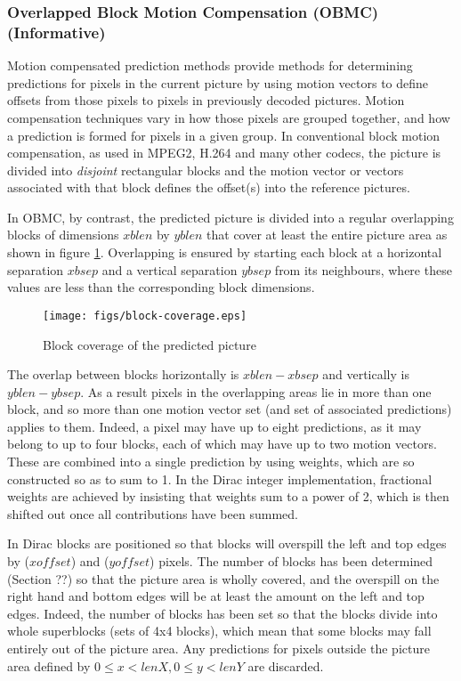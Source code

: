 \begin{informative*}
\subsubsection{Overlapped Block Motion Compensation (OBMC) (Informative)}

Motion compensated prediction methods provide methods for determining 
predictions for pixels in the current picture by using motion vectors to 
define offsets from those pixels to pixels in previously decoded
pictures. Motion compensation techniques vary in how those pixels are grouped
together, and how a prediction is formed for pixels in a given group. In 
conventional  block motion compensation, as used in MPEG2, H.264 and many other
codecs, the picture is divided into {\em disjoint} rectangular blocks and the
motion vector or vectors associated with that block defines the offset(s) into
the reference pictures.

In OBMC, by contrast, the predicted picture is divided into a regular overlapping 
blocks of dimensions $xblen$ by $yblen$ that cover at least the entire picture 
area as shown in figure \ref{fig:blockcoverage}.  Overlapping is ensured by starting
each block at a horizontal separation $xbsep$ and a vertical separation $ybsep$ 
from its neighbours, where these values are less than the corresponding block dimensions.
\end{informative*}

\begin{figure}[!ht]
\centering
\texttt{[image: figs/block-coverage.eps]}
\caption{Block coverage of the predicted picture}
\label{fig:blockcoverage}
\end{figure}

\begin{informative*}
The overlap between blocks horizontally is $xblen - xbsep$ and vertically is
$yblen - ybsep$. As a result pixels in the overlapping areas lie in more than
one block, and so more than one motion vector set (and set of associated predictions)
applies to them. Indeed, a pixel may have up to eight predictions, as it may belong to
up to four blocks, each of which may have up to two motion vectors. These are combined
into a single prediction by using weights, which are so constructed so as to sum to 1. In the
 Dirac integer implementation, fractional weights are achieved by insisting that weights sum 
to a power of 2, which is then shifted out once all contributions have been summed.

In Dirac blocks are positioned so that blocks will overspill the left and top edges by 
($xoffset$) and ($yoffset$) pixels.  The number of blocks has been
determined (Section ??) so that the picture area is wholly covered, and the overspill
 on the right hand and bottom edges will be at least the amount on the left and top edges. 
Indeed, the number of blocks has been set so that the blocks divide into whole superblocks
(sets of 4x4 blocks), which mean that some blocks may fall entirely out of the picture area. 
 Any predictions for pixels outside the picture area defined by $0 \leq x < lenX, 0 \leq y <lenY$
are discarded.

\end{informative*}

